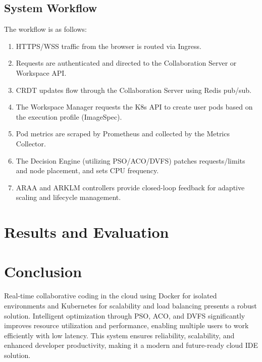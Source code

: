 \documentclass[12pt,a4paper]{report}
\begin{document}
\section{System Workflow}
The workflow is as follows:
\begin{enumerate}
    \item HTTPS/WSS traffic from the browser is routed via Ingress.
    \item Requests are authenticated and directed to the Collaboration Server or Workspace API.
    \item CRDT updates flow through the Collaboration Server using Redis pub/sub.
    \item The Workspace Manager requests the K8s API to create user pods based on the execution profile (ImageSpec).
    \item Pod metrics are scraped by Prometheus and collected by the Metrics Collector.
    \item The Decision Engine (utilizing PSO/ACO/DVFS) patches requests/limits and node placement, and sets CPU frequency.
    \item ARAA and ARKLM controllers provide closed-loop feedback for adaptive scaling and lifecycle management.
\end{enumerate}

\chapter{Results and Evaluation}

\chapter{Conclusion}
Real-time collaborative coding in the cloud using Docker for isolated environments and Kubernetes for scalability and load balancing presents a robust solution. Intelligent optimization through PSO, ACO, and DVFS significantly improves resource utilization and performance, enabling multiple users to work efficiently with low latency. This system ensures reliability, scalability, and enhanced developer productivity, making it a modern and future-ready cloud IDE solution.
\end{document}

